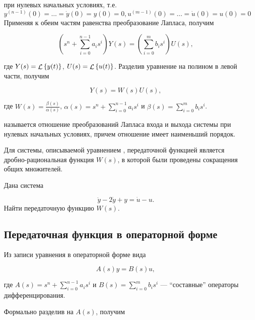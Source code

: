 \documentclass[../../TAU.tex]{subfiles}
\begin{document}
    при нулевых начальных условиях, т.е. 
    $y^{(n-1)} (0) = \ldots = \dot y(0) = y(0) = 0, u^{(m-1)} (0) = \ldots = \dot u(0) = u(0) = 0$
    Применяя к обеим частям равенства преобразование Лапласа, получим

    \begin{equation}\label{EQ_W}
    \left(s^n + \sum_{i=0}^{n-1}a_is^i\right) Y(s) = \left(\sum_{i=0}^{m}b_is^i\right) U(s),
    \end{equation}

    где $Y(s) = \mathop{\mathcal{L}}\nolimits\left\{y(t)\right\}$, $U(s) = \mathop{\mathcal{L}}\nolimits\left\{u(t)\right\}$. Разделив уравнение  на полином в левой части, получим

    \begin{equation}  
        Y(s) = W(s)U(s),
    \end{equation}

    где 
    $W(s) = \frac{\beta(s)}{\alpha(s)}$, 
    $\alpha(s) = s^n + \sum_{i=0}^{n-1}a_is^i$ и 
    $\beta(s) = \sum_{i=0}^{m}b_is^i$.

     называется отношение преобразований Лапласа входа и выхода системы при нулевых начальных условиях, причем отношение имеет наименьший порядок.

    Для системы, описываемой уравнением , передаточной функцией является дробно-рациональная функция $W(s)$, в которой были проведены сокращения общих множителей.

    \examp Дана система
    
    $$
        \ddot y - 2\dot y + y = \dot u - u.
    $$
    Найти передаточную функцию $W(s)$.


\subsection{Передаточная функция в операторной форме} %

    Из записи уравнения  в операторной форме вида
    
    \begin{equation}\label{EQ_ODU_SYM_1}
        A(s)y = B(s)u,
    \end{equation}
    
    где 
    $A(s) = s^n + \sum_{i=0}^{n-1}a_is^i$ и 
    $B(s) = \sum_{i=0}^{m}b_is^i$ --- ``составные'' операторы дифференцирования.

    Формально разделив  на $A(s)$, получим
    
\end{document}
